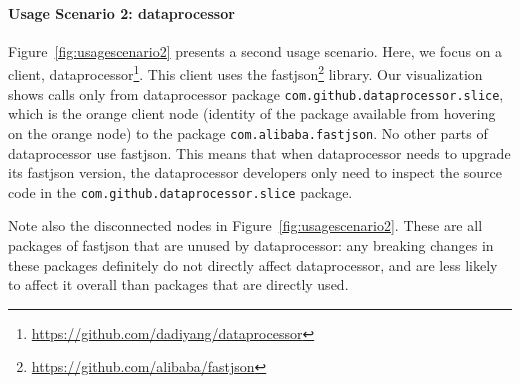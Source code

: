 \paragraph{Usage Scenario 2: dataprocessor}

Figure~\ref{fig:usagescenario2} presents a second usage scenario. Here, we focus on a client, dataprocessor\footnote{\url{https://github.com/dadiyang/dataprocessor}\label{dataprocessor}}. This client uses the fastjson\footnote{\url{https://github.com/alibaba/fastjson}\label{fastjson}} library. Our visualization shows calls only from dataprocessor package \texttt{com.github.dataprocessor.slice}, which is the orange client node (identity of the package available from hovering on the orange node) to the package \texttt{com.alibaba.fastjson}. No other parts of dataprocessor use fastjson. This means that when dataprocessor needs to upgrade its fastjson version, the dataprocessor developers only need to inspect the source code in the \texttt{com.github.dataprocessor.slice} package. 

Note also the disconnected nodes in Figure~\ref{fig:usagescenario2}. These are all packages of fastjson that are unused by dataprocessor: any breaking changes in these packages definitely do not directly affect dataprocessor, and are less likely to affect it overall than packages that are directly used.
